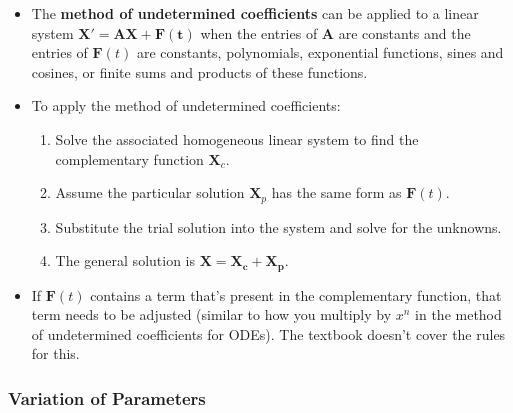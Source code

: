 \documentclass{article}
\begin{document}
\begin{itemize}
  \item The \textbf{method of undetermined coefficients} can be applied to a linear system $\mathbf{X' = A X + F(t)}$ when the entries of $\mathbf{A}$ are constants and the entries of $\mathbf{F}(t)$ are constants, polynomials, exponential functions, sines and cosines, or finite sums and products of these functions.

  \item To apply the method of undetermined coefficients:

        \begin{enumerate}
          \item Solve the associated homogeneous linear system to find the complementary function $\mathbf{X}_c$.

          \item Assume the particular solution $\mathbf{X}_p$ has the same form as $\mathbf{F}(t)$.

          \item Substitute the trial solution into the system and solve for the unknowns.

          \item The general solution is $\mathbf{X} = \mathbf{X_c + X_p}$.
        \end{enumerate}

  \item If $\mathbf{F}(t)$ contains a term that's present in the complementary function, that term needs to be adjusted (similar to how you multiply by $x^n$ in the method of undetermined coefficients for ODEs). The textbook doesn't cover the rules for this.
\end{itemize}

\subsubsection{Variation of Parameters}
\end{document}
